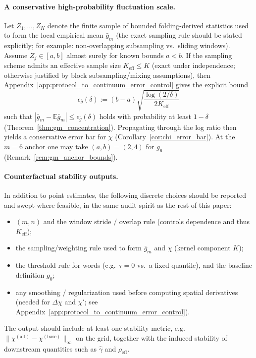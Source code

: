 \paragraph{A conservative high-probability fluctuation scale.}
\AuditTag Let $Z_1,\dots,Z_K$ denote the finite sample of bounded folding-derived statistics used to form the local empirical mean $\bar g_m$ (the exact sampling rule should be stated explicitly; for example: non-overlapping subsampling vs.\ sliding windows).
Assume $Z_j\in[a,b]$ almost surely for known bounds $a<b$.
If the sampling scheme admits an effective sample size $K_{\mathrm{eff}}\le K$ (exact under independence; otherwise justified by block subsampling/mixing assumptions), then Appendix~\ref{app:protocol_to_continuum_error_control} gives the explicit bound
\[
\epsilon_{\bar g}(\delta)
:=(b-a)\sqrt{\frac{\log(2/\delta)}{2K_{\mathrm{eff}}}}
\]
such that $|\bar g_m-\mathbb{E}\bar g_m|\le \epsilon_{\bar g}(\delta)$ holds with probability at least $1-\delta$ (Theorem~\ref{thm:gm_concentration}).
Propagating through the log ratio then yields a conservative error bar for $\chi$ (Corollary~\ref{cor:chi_error_bar}).
At the $m=6$ anchor one may take $(a,b)=(2,4)$ for $g_6$ (Remark~\ref{rem:gm_anchor_bounds}).

\paragraph{Counterfactual stability outputs.}
\AuditTag In addition to point estimates, the following discrete choices should be reported and swept where feasible, in the same audit spirit as the rest of this paper:
\begin{itemize}
\item $(m,n)$ and the window stride / overlap rule (controls dependence and thus $K_{\mathrm{eff}}$);
\item the sampling/weighting rule used to form $\bar g_m$ and $\chi$ (kernel component $K$);
\item the threshold rule for words (e.g.\ $\tau=0$ vs.\ a fixed quantile), and the baseline definition $\bar g_0$;
\item any smoothing / regularization used before computing spatial derivatives (needed for $\Delta\chi$ and $\chi'$; see Appendix~\ref{app:protocol_to_continuum_error_control}).
\end{itemize}
The output should include at least one stability metric, e.g.\ $\|\chi^{(\mathrm{alt})}-\chi^{(\mathrm{base})}\|_\infty$ on the grid, together with the induced stability of downstream quantities such as $\widehat\gamma$ and $\rho_{\mathrm{eff}}$.

